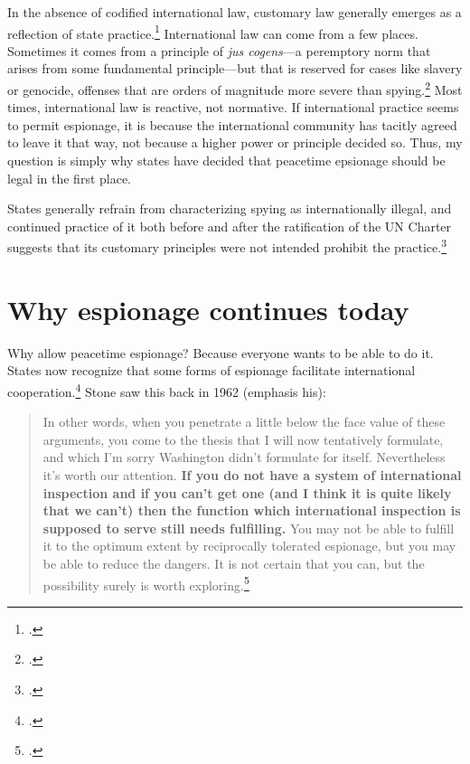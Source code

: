 \documentclass{memoir}
\begin{document}
\begin{refsegment}
In the absence of codified international law, customary law generally emerges as a reflection of state practice.\footcite[p.~628]{sulmasy_counterintuitive_2007} International law can come from a few places. Sometimes it comes from a principle of \emph{jus cogens}---a peremptory norm that arises from some fundamental principle---but that is reserved for cases like slavery or genocide, offenses that are orders of magnitude more severe than spying.\footcite[p.~629]{sulmasy_counterintuitive_2007} Most times, international law is reactive, not normative. If international practice seems to permit espionage, it is because the international community has tacitly agreed to leave it that way, not because a higher power or principle decided so. Thus, my question is simply why states have decided that peacetime epsionage should be legal in the first place.

States generally refrain from characterizing spying as internationally illegal, and continued practice of it both before and after the ratification of the UN Charter suggests that its customary principles were not intended prohibit the practice.\footcite[p.~305]{deeks_international_2015}

\section{Why espionage continues today}
Why allow peacetime espionage? Because everyone wants to be able to do it. States now recognize that some forms of espionage facilitate international cooperation.\footcite{baker_tolerance_2004} Stone saw this back in 1962 (emphasis his):


\begin{quote}
In other words, when you penetrate a little below the face value of these arguments, you come to the thesis that I will now tentatively formulate, and which I'm sorry Washington didn't formulate for itself. Nevertheless it's worth our attention. \textbf{If you do not have a system of international inspection and if you can't get one (and I think it is quite likely that we can't) then the function which international inspection is supposed to serve still needs fulfilling.} You may not be able to fulfill it to the optimum extent by reciprocally tolerated espionage, but you may be able to reduce the dangers. It is not certain that you can, but the possibility surely is worth exploring.\footcite[p.~41]{stone_legal_1962}
\end{quote}


\end{refsegment}
\end{document}
